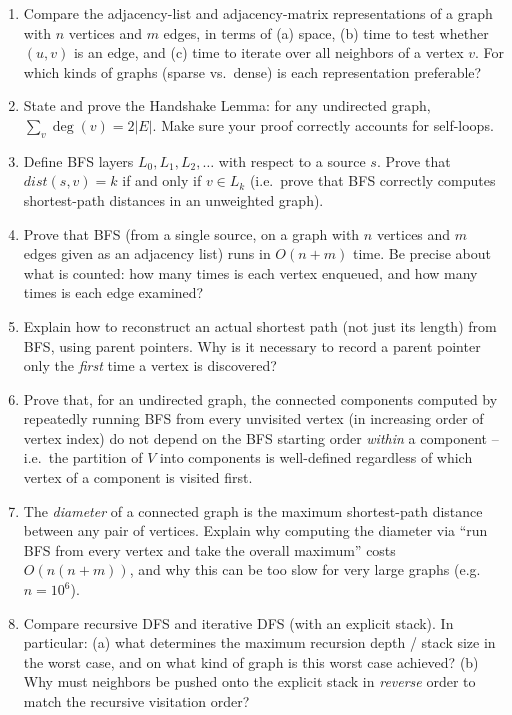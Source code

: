 \documentclass[11pt]{article}
\begin{document}
\begin{enumerate}[label=\textbf{A\arabic*.}, leftmargin=2.2em]

\item Compare the adjacency-list and adjacency-matrix representations of a graph with
$n$ vertices and $m$ edges, in terms of (a) space, (b) time to test whether $(u,v)$ is an
edge, and (c) time to iterate over all neighbors of a vertex $v$. For which kinds of
graphs (sparse vs.\ dense) is each representation preferable?

\item State and prove the Handshake Lemma: for any undirected graph,
$\sum_{v} \deg(v) = 2|E|$. Make sure your proof correctly accounts for self-loops.

\item Define BFS layers $L_0, L_1, L_2, \dots$ with respect to a source $s$. Prove that
$dist(s,v) = k$ if and only if $v \in L_k$ (i.e.\ prove that BFS correctly computes
shortest-path distances in an unweighted graph).

\item Prove that BFS (from a single source, on a graph with $n$ vertices and $m$ edges
given as an adjacency list) runs in $O(n+m)$ time. Be precise about what is counted: how
many times is each vertex enqueued, and how many times is each edge examined?

\item Explain how to reconstruct an actual shortest path (not just its length) from BFS,
using parent pointers. Why is it necessary to record a parent pointer only the
\emph{first} time a vertex is discovered?

\item Prove that, for an undirected graph, the connected components computed by
repeatedly running BFS from every unvisited vertex (in increasing order of vertex index)
do not depend on the BFS starting order \emph{within} a component -- i.e.\ the partition
of $V$ into components is well-defined regardless of which vertex of a component is
visited first.

\item The \emph{diameter} of a connected graph is the maximum shortest-path distance
between any pair of vertices. Explain why computing the diameter via ``run BFS from every
vertex and take the overall maximum'' costs $O(n(n+m))$, and why this can be too slow for
very large graphs (e.g.\ $n = 10^6$).

\item Compare recursive DFS and iterative DFS (with an explicit stack). In particular:
(a) what determines the maximum recursion depth / stack size in the worst case, and on
what kind of graph is this worst case achieved? (b) Why must neighbors be pushed onto the
explicit stack in \emph{reverse} order to match the recursive visitation order?


\end{enumerate}
\end{document}
